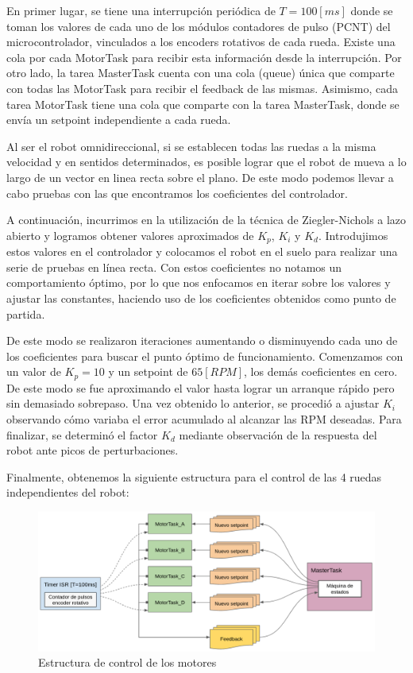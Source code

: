 En primer lugar, se tiene una interrupción periódica de $T=100[ms]$ donde se toman los valores de cada uno de los módulos contadores de pulso (PCNT) del microcontrolador, vinculados a los encoders rotativos de cada rueda. Existe una cola por cada MotorTask para recibir esta información desde la interrupción. Por otro lado, la tarea MasterTask cuenta con una cola (queue) única que comparte con todas las MotorTask para recibir el feedback de las mismas. Asimismo, cada tarea MotorTask tiene una cola que comparte con la tarea MasterTask, donde se envía un setpoint independiente a cada rueda.

Al ser el robot omnidireccional, si se establecen todas las ruedas a la misma velocidad y en sentidos determinados, es posible lograr que el robot de mueva a lo largo de un vector en linea recta sobre el plano. De este modo podemos llevar a cabo pruebas con las que encontramos los coeficientes del controlador.

A continuación, incurrimos en la utilización de la técnica de Ziegler-Nichols a lazo abierto y logramos obtener valores aproximados de $K_p$, $K_i$ y $K_d$. Introdujimos estos valores en el controlador y colocamos el robot en el suelo para realizar una serie de pruebas en línea recta. Con estos coeficientes no notamos un comportamiento óptimo, por lo que nos enfocamos en iterar sobre los valores y ajustar las constantes, haciendo uso de los coeficientes obtenidos como punto de partida.

De este modo se realizaron iteraciones aumentando o disminuyendo cada uno de los coeficientes para buscar el punto óptimo de funcionamiento. Comenzamos con un valor de $K_p=10$ y un setpoint de $65[RPM]$, los demás coeficientes en cero. De este modo se fue aproximando el valor hasta lograr un arranque rápido pero sin demasiado sobrepaso. Una vez obtenido lo anterior, se procedió a ajustar $K_i$ observando cómo variaba el error acumulado al alcanzar las RPM deseadas. Para finalizar, se determinó el factor $K_d$ mediante observación de la respuesta del robot ante picos de perturbaciones.

Finalmente, obtenemos la siguiente estructura para el control de las 4 ruedas independientes del robot:

\begin{figure}[H]
    \centering
    \hspace*{-0.75cm}
    \includegraphics[width=1.05\linewidth]{images/diag_comp_esp32_pid_solo_todos_los_motores.png}
    \caption{Estructura de control de los motores}
    \label{fig:diagcommpesp32pidmotores}
\end{figure}


